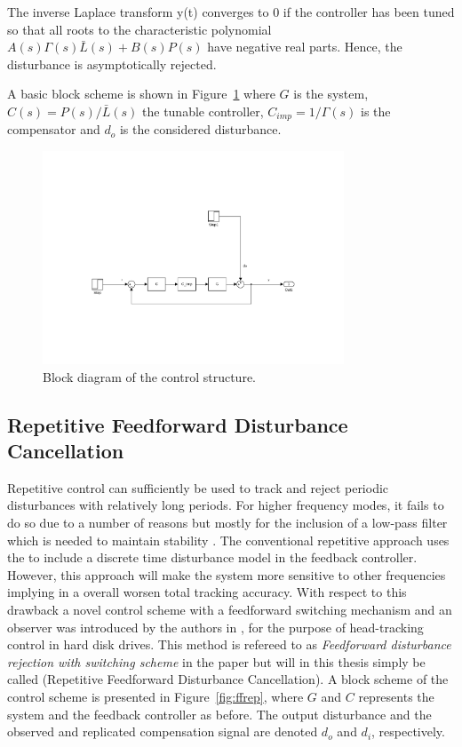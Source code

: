 The inverse Laplace transform y(t) converges to 0 if the controller has been tuned so that all roots to the characteristic polynomial $A(s)\Gamma(s)\bar{L}(s) + B(s)P(s)$ have negative real parts. Hence, the disturbance is asymptotically rejected.

A basic block scheme is shown in Figure~\ref{fig:imp} where $G$ is the system, $C(s) = P(s)/\bar{L}(s)$ the tunable controller, $C_{imp} = 1/\Gamma(s)$ is the compensator and $d_o$ is the considered disturbance.

\begin{figure}[h!]
  \centering %
  \includegraphics[width=0.8\textwidth, trim=6.5cm 5.5cm 5.97cm 11cm, clip=true]{fig/matlab/imp}
  \caption{\label{fig:imp}Block diagram of the \abbrIMP control structure.}
\end{figure}
\newpage
\subsection{Repetitive Feedforward Disturbance Cancellation}
Repetitive control can sufficiently be used to track and reject periodic disturbances with relatively long periods. For higher frequency modes, it fails to do so due to a number of reasons but mostly for the inclusion of a low-pass filter which is needed to maintain stability \citep{fujimoto2009rro}. The conventional repetitive approach uses the \abbrIMP to include a discrete time disturbance model in the feedback controller. However, this approach will make the system more sensitive to other frequencies implying in a overall worsen total tracking accuracy. With respect to this drawback a novel control scheme with a feedforward switching mechanism and an observer was introduced by the authors in \citep{fujimoto2004repetitive}, for the purpose of head-tracking control in hard disk drives. This method is refereed to as \emph{Feedforward disturbance rejection with switching
scheme} in the paper but will in this thesis simply be called \abbrRFDC (Repetitive Feedforward Disturbance Cancellation). A block scheme of the control scheme is presented in Figure~\ref{fig:ffrep}, where $G$ and $C$ represents the system and the feedback controller as before. The output disturbance and the observed and replicated compensation signal are denoted $d_o$ and $d_i$, respectively.

